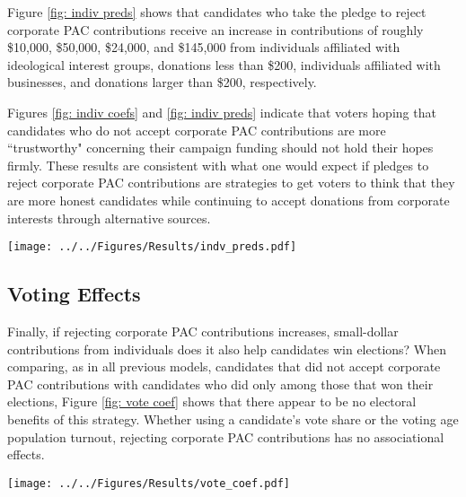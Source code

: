 \documentclass[12pt]{article}
\begin{document}
Figure \ref{fig: indiv preds} shows that candidates who take the pledge to reject corporate PAC contributions receive an increase in contributions of roughly \$10,000, \$50,000, \$24,000, and \$145,000 from individuals affiliated with ideological interest groups, donations less than \$200, individuals affiliated with businesses, and donations larger than \$200, respectively. 

Figures \ref{fig: indiv coefs} and \ref{fig: indiv preds} indicate that voters hoping that candidates who do not accept corporate PAC contributions are more ``trustworthy" concerning their campaign funding should not hold their hopes firmly. These results are consistent with what one would expect if pledges to reject corporate PAC contributions are strategies to get voters to think that they are more honest candidates while continuing to accept donations from corporate interests through alternative sources. 
 
\begin{figure*}[!htb]
    \centering
    \texttt{[image: ../../Figures/Results/indv\_preds.pdf]}
    \caption{\textbf{Total Predicted Contributions from Individuals by Candidate Type.} This figure shows that candidates who pledge to reject PAC contributions are predicted to received more contributions from individuals affiliated with ideological and business interests, as well as contributions less than and greater than \$200.}
    \label{fig: indiv preds}
\end{figure*}


\subsection{Voting Effects}

Finally, if rejecting corporate PAC contributions increases, small-dollar contributions from individuals does it also help candidates win elections? When comparing, as in all previous models, candidates that did not accept corporate PAC contributions with candidates who did only among those that won their elections, Figure \ref{fig: vote coef} shows that there appear to be no electoral benefits of this strategy. Whether using a candidate's vote share or the voting age population turnout, rejecting corporate PAC contributions has no associational effects. 

\begin{figure*}[!htb]
    \center
    \texttt{[image: ../../Figures/Results/vote\_coef.pdf]}
    \caption{\textbf{The Effect of Rejecting Corporate PAC Contributions on Vote Share and Turnout.} These figures present the posterior distributions estimated for a candidate that pledges to reject corporate PAC contributions. The dot shows the median coefficient estimate, and the intervals show the 50\% and 89\% highest density intervals. This figure shows that rejecting corporate PAC contributions does not affect a candidate's vote percentage or turnout. See Table \ref{tbl: vote results} for the formal estimates.}
    \label{fig: vote coef}
\end{figure*}
\end{document}
